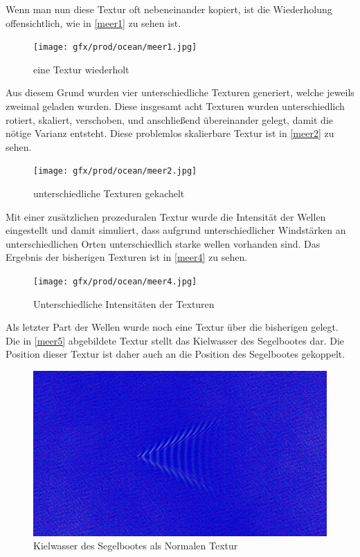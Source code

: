 Wenn man nun diese Textur oft nebeneinander kopiert, ist die Wiederholung offensichtlich, wie in \autoref{meer1} zu sehen ist.

\begin{figure}[H]
\texttt{[image: gfx/prod/ocean/meer1.jpg]}
\caption{eine Textur wiederholt}
\label{meer1}
\end{figure}

Aus diesem Grund wurden vier unterschiedliche Texturen generiert, welche jeweils zweimal geladen wurden. Diese insgesamt acht Texturen wurden unterschiedlich rotiert, skaliert, verschoben, und anschließend übereinander gelegt, damit die nötige Varianz entsteht. Diese problemlos skalierbare Textur ist in \autoref{meer2} zu sehen.

\begin{figure}[H]
\texttt{[image: gfx/prod/ocean/meer2.jpg]}
\caption{unterschiedliche Texturen gekachelt}
\label{meer2}
\end{figure}

Mit einer zusätzlichen prozeduralen Textur wurde die Intensität der Wellen eingestellt und damit simuliert, dass aufgrund unterschiedlicher Windstärken an unterschiedlichen Orten unterschiedlich starke wellen vorhanden sind. Das Ergebnis der bisherigen Texturen ist in \autoref{meer4} zu sehen.


\begin{figure}[H]
\texttt{[image: gfx/prod/ocean/meer4.jpg]}
\caption{Unterschiedliche Intensitäten der Texturen}
\label{meer4}
\end{figure}

Als letzter Part der Wellen wurde noch eine Textur über die bisherigen gelegt. Die in \autoref{meer5} abgebildete Textur  stellt das Kielwasser des Segelbootes dar. Die Position dieser Textur ist daher auch an die Position des Segelbootes gekoppelt.

\begin{figure}[H]
\includegraphics[width=\textwidth]{gfx/prod/ocean/meer5.jpg}
\caption{Kielwasser des Segelbootes als Normalen Textur}
\label{meer5}
\end{figure}


